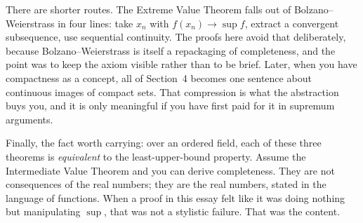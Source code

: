 \documentclass{essay}
\begin{document}
There are shorter routes. The Extreme Value Theorem falls out of Bolzano--Weierstrass in four lines: take $x_{n}$ with $f(x_{n}) \to \sup f$, extract a convergent subsequence, use sequential continuity. The proofs here avoid that deliberately, because Bolzano--Weierstrass is itself a repackaging of completeness, and the point was to keep the axiom visible rather than to be brief. Later, when you have compactness as a concept, all of Section~4 becomes one sentence about continuous images of compact sets. That compression is what the abstraction buys you, and it is only meaningful if you have first paid for it in supremum arguments.

Finally, the fact worth carrying: over an ordered field, each of these three theorems is \emph{equivalent} to the least-upper-bound property. Assume the Intermediate Value Theorem and you can derive completeness. They are not consequences of the real numbers; they are the real numbers, stated in the language of functions. When a proof in this essay felt like it was doing nothing but manipulating $\sup$, that was not a stylistic failure. That was the content.
\end{document}
